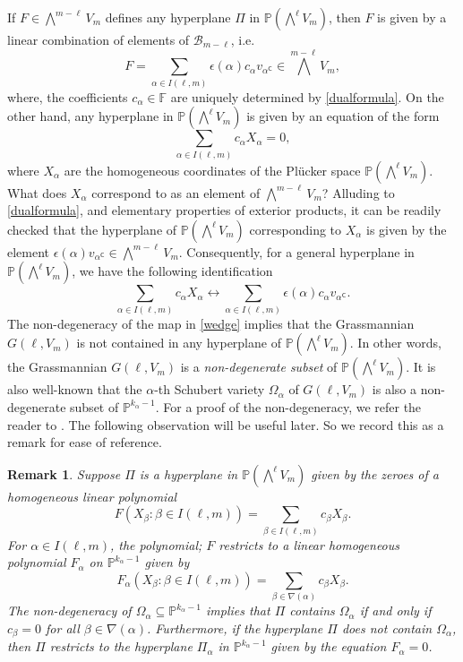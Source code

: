 \documentclass[10pt,a4paper,oneside]{amsproc}
\newtheorem{remark}[theorem]{Remark}
\newcommand{\B}{\mathcal{B}}
\def\a{{\alpha}}
\def\FF{{\mathbb F}}
\def\PP{{\mathbb P}}
\begin{document}
If $F \in \bigwedge^{m- \ell} V_m$ defines any hyperplane $\Pi$ in $\PP(\bigwedge^{\ell} V_m)$, then $F$ is given by a linear combination of elements of $\B_{m-\ell}$, i.e. 
\begin{equation}\label{hyperplane}
  F = \sum_{\a \in I(\ell, m)}{\epsilon(\a)} c_\a  v_{\a^{\mathsf{C}}} \in \bigwedge^{m-\ell} V_m,  
\end{equation}
where, the coefficients $c_{\a} \in \FF$ are uniquely determined by \eqref{dualformula}.  On the other hand, any hyperplane in $\PP(\bigwedge^\ell V_m)$ is given by an equation of the form 
$$\sum_{\a \in I(\ell, m)} c_\a X_\a =0,$$
where $X_\a$ are the homogeneous coordinates of the Pl\"ucker space $\PP (\bigwedge^{\ell} V_m)$. 
What does $X_\a$ correspond to as an element of $\bigwedge^{m-\ell} V_m$? Alluding to  \eqref{dualformula}, and elementary properties of exterior products, it can be readily checked that the hyperplane of $\PP(\bigwedge^\ell V_m)$ corresponding to $X_\a$ is given by the element ${\epsilon(\a)} v_{\a^{\mathsf{C}}} \in \bigwedge^{m-\ell} V_m$. Consequently, for a general hyperplane in $\PP (\bigwedge^{\ell} V_m)$, we have the following identification 
\begin{equation}\label{hypid}
    \sum_{\a \in I (\ell, m)} c_\a X_{\a} \longleftrightarrow \sum_{\a \in I(\ell, m)} {\epsilon(\a)} c_\a v_{\a^{\mathsf{C}}}.
\end{equation}
 The non-degeneracy of the map in \eqref{wedge} implies that the Grassmannian $G(\ell, V_m)$ is not contained in any hyperplane of $\PP \left(\bigwedge^{\ell} V_m\right)$. In other words, the Grassmannian $G(\ell, V_m)$ is a \emph{non-degenerate subset} of $\PP(\bigwedge^{\ell} V_m)$. It is also well-known that the $\a$-th Schubert variety $\Omega_\a$ of $G(\ell, V_m)$ is also a non-degenerate subset of $\PP^{k_\a - 1}$. For a proof of the non-degeneracy, we refer the reader to \cite[Remark 5.3.4]{LB}. The following observation will be useful later. So we record this as a remark for ease of reference. 
 

 

\begin{remark}\label{rem1}\normalfont
Suppose $\Pi$ is a hyperplane in $\PP (\bigwedge^{\ell} V_m)$ given by the zeroes of a homogeneous linear polynomial $$F(X_\beta : \beta \in I(\ell, m)) = \sum_{\beta \in I(\ell, m)} c_\beta X_\beta.$$ For $\a \in I(\ell, m)$, the polynomial; $F$ restricts to a linear homogeneous polynomial $F_\a$ on $\PP^{k_\a-1}$ given by 
$$F_\a (X_\beta : \beta \in I(\ell, m)) = \sum_{\beta \in \nabla(\a)} c_\beta X_\beta.$$
The non-degeneracy of $\Omega_\a \subseteq \PP^{k_\a - 1}$ implies that $\Pi$ contains $\Omega_\a$ if and only if $c_{\beta} = 0$ for all $\beta \in \nabla(\a)$. Furthermore, if the hyperplane $\Pi$ does not contain $\Omega_\a$, then $\Pi$ restricts to the hyperplane $\Pi_\a$ in $\PP^{k_\a - 1}$ given by the equation $F_\a = 0$. 
\end{remark}
 
\end{document}
